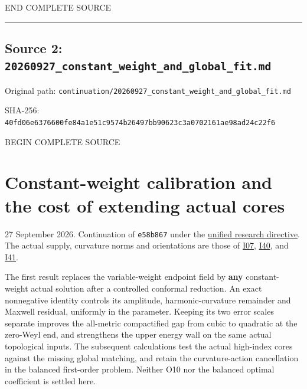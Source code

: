 \documentclass[
  10pt,
]{article}
\begin{document}
END COMPLETE SOURCE

\begin{center}\rule{0.5\linewidth}{0.5pt}\end{center}

\hypertarget{source-2-20260927_constant_weight_and_global_fit.md}{%
\subsection{Source 2:
\nolinkurl{20260927_constant_weight_and_global_fit.md}}\label{source-2-20260927_constant_weight_and_global_fit.md}}

Original path:
\nolinkurl{continuation/20260927_constant_weight_and_global_fit.md}

SHA-256:
\nolinkurl{40fd06e6376600fe84a1e51c9574b26497bb90623c3a0702161ae98ad24c22f6}

BEGIN COMPLETE SOURCE

\hypertarget{constant-weight-calibration-and-the-cost-of-extending-actual-cores}{%
\section{Constant-weight calibration and the cost of extending actual
cores}\label{constant-weight-calibration-and-the-cost-of-extending-actual-cores}}

27 September 2026. Continuation of \texttt{e58b867} under the
\href{../guidance/source/20260927_unified_research_directive.zh.md}{unified
research directive}. The actual supply, curvature norms and orientations
are those of
\href{../mathematics/current/line1_functional_pencil.md}{I07},
\href{20260927_mixed_current_and_signed_cores.md}{I40}, and
\href{20260927_conformal_separation_and_zero_end.md}{I41}.

The first result replaces the variable-weight endpoint field by
\textbf{any} constant-weight actual solution after a controlled
conformal reduction. An exact nonnegative identity controls its
amplitude, harmonic-curvature remainder and Maxwell residual, uniformly
in the parameter. Keeping its two error scales separate improves the
all-metric compactified gap from cubic to quadratic at the zero-Weyl
end, and strengthens the upper energy wall on the same actual
topological inputs. The subsequent calculations test the actual
high-index cores against the missing global matching, and retain the
curvature-action cancellation in the balanced first-order problem.
Neither O10 nor the balanced optimal coefficient is settled here.
\end{document}
